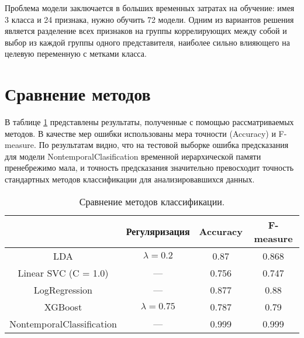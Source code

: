Проблема модели заключается в больших временных затратах на обучение: имея 3 класса и 24 признака, нужно обучить 72 модели. Одним из вариантов решения является разделение всех признаков на группы коррелирующих между собой и выбор из каждой группы одного представителя, наиболее сильно влияющего на целевую переменную с метками класса.

\section{Сравнение методов}\label{compute_part:method_compare}
В таблице \ref{tbl:results_compare} представлены результаты, полученные с помощью рассматриваемых методов. В качестве мер ошибки использованы мера точности (Accuracy) и F-measure. По результатам видно, что на тестовой выборке ошибка предсказания для модели NontemporalClasification временной иерархической памяти пренебрежимо мала, и точность предсказания значительно превосходит точность стандартных методов классификации для анализировавшихся данных.
 
\begin{table}[h!]
\caption{Сравнение методов классификации.} \label{tbl:results_compare} 
 \begin{center}
  \begin{tabular}{|c|c|c|c|}
	\hline  & Регуляризация & Accuracy & F-measure \\ 
	\hline LDA & $\lambda = 0.2$ & 0.87 & 0.868 \\ 
	\hline Linear SVC (C = 1.0)  & --- & 0.756 & 0.747  \\
	\hline LogRegression  & ---  & 0.877 & 0.88 \\
	\hline XGBoost  &  $\lambda = 0.75$   & 0.787 & 0.79 \\
	\hline NontemporalClassification & --- & 0.999 & 0.999 \\
	\hline 
  \end{tabular} 
 \end{center}
\end{table}
